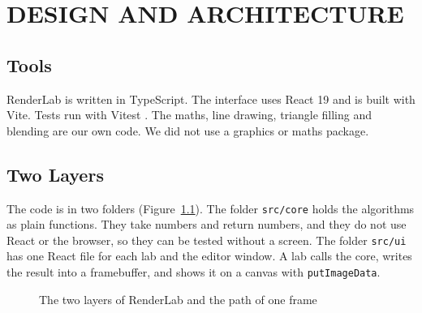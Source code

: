\chapter{DESIGN AND ARCHITECTURE}\nonum

\section{Tools}
RenderLab is written in TypeScript. The interface uses React 19 and is built with Vite. Tests run with Vitest \cite{vitest}. The maths, line drawing, triangle filling and blending are our own code. We did not use a graphics or maths package.

\section{Two Layers}
The code is in two folders (Figure~\ref{fig:arch}). The folder \texttt{src/core} holds the algorithms as plain functions. They take numbers and return numbers, and they do not use React or the browser, so they can be tested without a screen. The folder \texttt{src/ui} has one React file for each lab and the editor window. A lab calls the core, writes the result into a framebuffer, and shows it on a canvas with \texttt{putImageData}.

\begin{figure}[H]
\centering
{}
\caption{The two layers of RenderLab and the path of one frame}
\label{fig:arch}
\end{figure}

